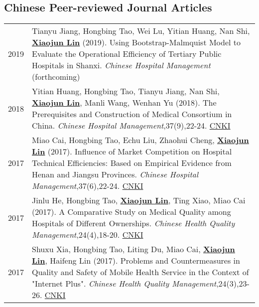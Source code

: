 \documentclass[a4paper,10pt]{article}
\begin{document}
\subsection*{Chinese Peer-reviewed Journal Articles}
\begin{longtable}{r p{13cm}}

2019 & Tianyu Jiang, Hongbing Tao, Wei Lu, Yitian Huang, Nan Shi, \underline{\textbf{Xiaojun Lin}} (2019). Using Bootstrap-Malmquist Model to Evaluate the Operational Efficiency of Tertiary Public Hospitals in Shanxi.  \emph{Chinese Hospital Management} (forthcoming) \\
2018 & Yitian Huang, Hongbing Tao, Tianyu Jiang, Nan Shi, \underline{\textbf{Xiaojun Lin}}, Manli Wang, Wenhan Yu (2018). The Prerequisites and Construction of Medical Consortium in China. \emph{Chinese Hospital Management},37(9),22-24. \href{http://kns.cnki.net/KCMS/detail/detail.aspx?dbcode=CJFQ&dbname=CJFDLAST2018&filename=YYGL201809005&v=MjIxMjdlWnVadEZpRGxWNzNPUERUTVlyRzRIOW5NcG85RllZUjhlWDFMdXhZUzdEaDFUM3FUcldNMUZyQ1VSTEs=}{CNKI} \\
2017 & Miao Cai, Hongbing Tao, Echu Liu, Zhaohui Cheng, \underline{\textbf{Xiaojun Lin}} (2017). Influence of Market Competition on Hospital Technical Efficiencies: Based on Empirical Evidence from Henan and Jiangsu Provinces. \emph{Chinese Hospital Management},37(6),22-24. 
\href{http://kns.cnki.net/KCMS/detail/detail.aspx?dbcode=CJFQ&dbname=CJFDLAST2017&filename=YYGL201706012&v=MzEzMTREbFZMdkFQRFRNWXJHNEg5Yk1xWTlFWm9SOGVYMUx1eFlTN0RoMVQzcVRyV00xRnJDVVJMS2VadVp0Rmk=}{CNKI}\\
2017 & Jinlu He, Hongbing Tao, \underline{\textbf{Xiaojun Lin}}, Ting Xiao, Miao Cai (2017). A Comparative Study on Medical Quality among Hospitals of Different Ownerships. \emph{Chinese Health Quality Management},24(4),18-20. \href{http://kns.cnki.net/KCMS/detail/detail.aspx?dbcode=CJFQ&dbname=CJFDLAST2017&filename=WSJG201704010&v=MTU5NzM0OUVaSVI4ZVgxTHV4WVM3RGgxVDNxVHJXTTFGckNVUkxLZVp1WnRGaURtVTcvTU1qN0JhYkc0SDliTXE=}{CNKI}\\
2017 & Shuxu Xia, Hongbing Tao, Liting Du, Miao Cai, \underline{\textbf{Xiaojun Lin}}, Haifeng Lin (2017). Problems and Countermeasures in Quality and Safety of Mobile Health Service in the Context of "Internet Plus". \emph{Chinese Health Quality Management},24(3),23-26. \href{http://kns.cnki.net/KCMS/detail/detail.aspx?dbcode=CJFQ&dbname=CJFDLAST2017&filename=WSJG201703030&v=MjQwMTVHWklSOGVYMUx1eFlTN0RoMVQzcVRyV00xRnJDVVJMS2VadVp0RmlEbVViL01NajdCYWJHNEg5Yk1ySTk=}{CNKI}\\

\end{longtable}
\end{document}
